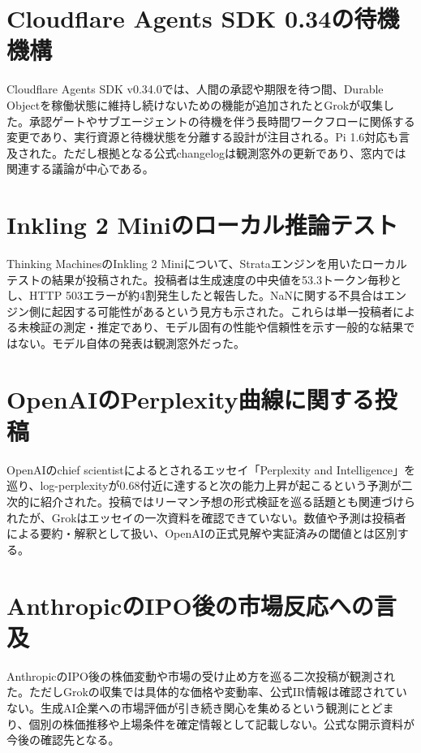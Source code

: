 \section{Cloudflare Agents SDK 0.34の待機機構}
Cloudflare Agents SDK v0.34.0では、人間の承認や期限を待つ間、Durable Objectを稼働状態に維持し続けないための機能が追加されたとGrokが収集した。承認ゲートやサブエージェントの待機を伴う長時間ワークフローに関係する変更であり、実行資源と待機状態を分離する設計が注目される。Pi 1.6対応も言及された。ただし根拠となる公式changelogは観測窓外の更新であり、窓内では関連する議論が中心である。

\section{Inkling 2 Miniのローカル推論テスト}
Thinking MachinesのInkling 2 Miniについて、Strataエンジンを用いたローカルテストの結果が投稿された。投稿者は生成速度の中央値を53.3トークン毎秒とし、HTTP 503エラーが約4割発生したと報告した。NaNに関する不具合はエンジン側に起因する可能性があるという見方も示された。これらは単一投稿者による未検証の測定・推定であり、モデル固有の性能や信頼性を示す一般的な結果ではない。モデル自体の発表は観測窓外だった。

\section{OpenAIのPerplexity曲線に関する投稿}
OpenAIのchief scientistによるとされるエッセイ「Perplexity and Intelligence」を巡り、log-perplexityが0.68付近に達すると次の能力上昇が起こるという予測が二次的に紹介された。投稿ではリーマン予想の形式検証を巡る話題とも関連づけられたが、Grokはエッセイの一次資料を確認できていない。数値や予測は投稿者による要約・解釈として扱い、OpenAIの正式見解や実証済みの閾値とは区別する。

\section{AnthropicのIPO後の市場反応への言及}
AnthropicのIPO後の株価変動や市場の受け止め方を巡る二次投稿が観測された。ただしGrokの収集では具体的な価格や変動率、公式IR情報は確認されていない。生成AI企業への市場評価が引き続き関心を集めるという観測にとどまり、個別の株価推移や上場条件を確定情報として記載しない。公式な開示資料が今後の確認先となる。
